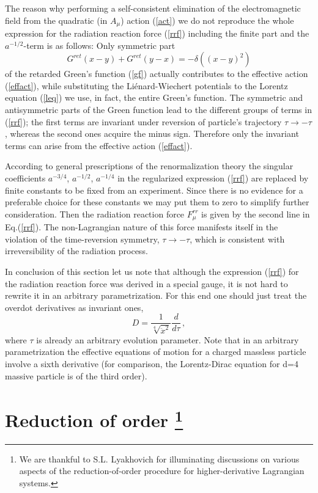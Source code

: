 \documentclass[a4paper,12pt]{article}
\begin{document}
The reason why performing a self-consistent elimination of the
electromagnetic field from the quadratic (in $A_\mu$) action
(\ref{act}) we do not reproduce the whole expression for the
radiation reaction force (\ref{rrf}) including the finite part
and the $a^{-1/2}$-term is as follows: Only symmetric part
\begin{equation}\label{}
G^{ret}(x-y)+G^{ret}(y-x)=-\delta((x-y)^2)
\end{equation}
of the retarded Green's function (\ref{gf}) actually contributes
to the effective action (\ref{effact}), while substituting the
Li\'enard-Wiechert potentials to the Lorentz equation (\ref{leq})
we use, in fact, the entire Green's function. The symmetric and
antisymmetric parts of the Green function lead to the different
groups of terms in (\ref{rrf}); the first terms are invariant
under reversion of particle's trajectory $\tau\rightarrow -\tau$,
whereas the second ones acquire the minus sign. Therefore only
the invariant terms can arise from the effective action
(\ref{effact}).

According  to general prescriptions of the renormalization theory
the singular coefficients $a^{-3/4}$, $a^{-1/2}$, $a^{-1/4}$ in
the regularized expression (\ref{rrf}) are replaced by finite
constants to be fixed from an experiment. Since there is no
evidence for a preferable choice for these constants we may put
them to zero to simplify further consideration. Then the
radiation reaction force $F_\mu^{rr}$ is given by the second line
in Eq.(\ref{rrf}). The non-Lagrangian nature of this force
manifests itself in the violation of the time-reversion symmetry,
$\tau \rightarrow -\tau$, which is consistent with
irreversibility of the radiation process.

In conclusion of this section let us note that although the
expression (\ref{rrf}) for the radiation reaction force was
derived in a special gauge, it is not hard to rewrite it
 in an arbitrary parametrization. For  this end one should just treat the
overdot derivatives as invariant ones,
\begin{equation}\label{}
D= \frac{1}{\sqrt[4]{\ddot{x}^2}}\frac{d}{d\tau}\,,
\end{equation}
where $\tau$ is already an arbitrary evolution parameter. Note
that in an arbitrary parametrization the effective equations of
motion for a charged massless particle involve a sixth derivative
(for comparison, the Lorentz-Dirac equation for d=4 massive
particle is of the third order).

\section{Reduction of order \protect \footnote{We are thankful
to S.L. Lyakhovich for illuminating discussions on various aspects
of the reduction-of-order procedure for higher-derivative
Lagrangian systems.} }
\end{document}
